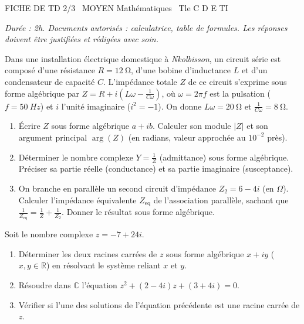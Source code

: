 \documentclass[11pt]{article}
\begin{document}
\begin{tcolorbox}[enhanced,colback=popink,colframe=popink,arc=10pt,boxrule=0pt,left=12pt,right=12pt,top=9pt,bottom=9pt]
{\color{white}\popxbold\small FICHE DE TD 2/3 \textbullet\ MOYEN \hfill Mathématiques \textbullet\ Tle C D E TI\par}
\end{tcolorbox}
\vspace{4pt}
\textit{Durée : 2h. Documents autorisés : calculatrice, table de formules. Les réponses doivent être justifiées et rédigées avec soin.}

\begin{exercice}
Dans une installation électrique domestique à \textit{Nkolbisson}, un circuit série est composé d'une résistance $R = \SI{12}{\ohm}$, d'une bobine d'inductance $L$ et d'un condensateur de capacité $C$. L'impédance totale $Z$ de ce circuit s'exprime sous forme algébrique par $Z = R + i\left(L\omega - \frac{1}{C\omega}\right)$, où $\omega = 2\pi f$ est la pulsation ($f = \SI{50}{Hz}$) et $i$ l'unité imaginaire ($i^2 = -1$).
On donne $L\omega = \SI{20}{\ohm}$ et $\frac{1}{C\omega} = \SI{8}{\ohm}$.
\begin{enumerate}
    \item Écrire $Z$ sous forme algébrique $a+ib$. Calculer son module $|Z|$ et son argument principal $\arg(Z)$ (en radians, valeur approchée au $10^{-2}$ près).
    \item Déterminer le nombre complexe $Y = \frac{1}{Z}$ (admittance) sous forme algébrique. Préciser sa partie réelle (conductance) et sa partie imaginaire (susceptance).
    \item On branche en parallèle un second circuit d'impédance $Z_2 = 6 - 4i$ (en $\Omega$). Calculer l'impédance équivalente $Z_{\text{eq}}$ de l'association parallèle, sachant que $\frac{1}{Z_{\text{eq}}} = \frac{1}{Z} + \frac{1}{Z_2}$. Donner le résultat sous forme algébrique.
\end{enumerate}
\end{exercice}

\begin{exercice}
Soit le nombre complexe $z = -7 + 24i$.
\begin{enumerate}
    \item Déterminer les deux racines carrées de $z$ sous forme algébrique $x+iy$ ($x,y \in \mathbb{R}$) en résolvant le système reliant $x$ et $y$.
    \item Résoudre dans $\mathbb{C}$ l'équation $z^2 + (2-4i)z + (3+4i) = 0$.
    \item Vérifier si l'une des solutions de l'équation précédente est une racine carrée de $z$.
\end{enumerate}
\end{exercice}
\end{document}
